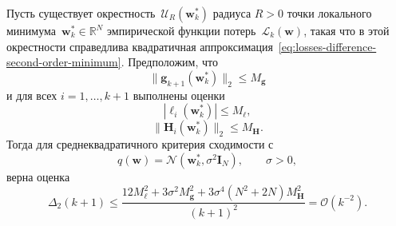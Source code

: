 \begin{theorem}
    \label{thm:squared-criterion-general}
    Пусть существует окрестность~$\mathcal U_R(\mathbf w_k^*)$ радиуса $R>0$
    точки локального минимума~$\mathbf w_k^* \in \mathbb R^N$ эмпирической
    функции потерь~$\mathcal L_k(\mathbf w)$, такая что в этой окрестности
    справедлива квадратичная аппроксимация~\eqref{eq:losses-difference-second-order-minimum}.
    Предположим, что
    \begin{equation}
        \label{eq:squared-criterion-thm-ass-grad}
        \|\mathbf g_{k+1}(\mathbf w_k^*)\|_2 \leqslant M_{\mathbf g}
    \end{equation}
    и для всех $i=1, \ldots, k+1$ выполнены оценки
    \begin{equation}
        \label{eq:squared-criterion-thm-ass-loss}
        |\ell_i(\mathbf w_k^*)| \leqslant M_\ell,
    \end{equation}
    \begin{equation}
        \label{eq:squared-criterion-thm-ass-hess}
        \|\mathbf H_i(\mathbf w_k^*)\|_2 \leqslant M_{\mathbf H}.
    \end{equation}
    Тогда для среднеквадратичного критерия сходимости с
    \begin{equation}
        q(\mathbf w)=\mathcal N(\mathbf w_k^*, \sigma^2 \mathbf I_N),
        \qquad
        \sigma>0,
    \end{equation}
    верна оценка
    \begin{equation}
        \label{eq:squared-criterion-general-theorem}
        \Delta_2(k+1)
        \leqslant
        \frac{
            12M_\ell^2
            +
            3\sigma^2 M_{\mathbf g}^2
            +
            3\sigma^4 (N^2+2N) M_{\mathbf H}^2
        }{(k+1)^2}
        = \mathcal{O}(k^{-2}).
    \end{equation}
\end{theorem}

